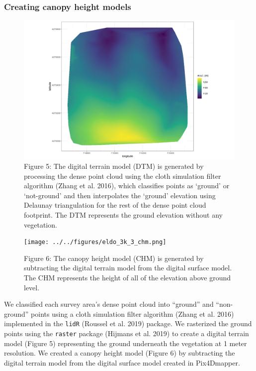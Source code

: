 \documentclass[]{article}
\begin{document}
\subsubsection{Creating canopy height
models}\label{creating-canopy-height-models}

\begin{figure}
\centering
\includegraphics{../../figures/eldo_3k_3_dtm.png}
\caption{Figure 5: The digital terrain model (DTM) is generated by
processing the dense point cloud using the cloth simulation filter
algorithm (Zhang et al. 2016), which classifies points as `ground' or
`not-ground' and then interpolates the `ground' elevation using Delaunay
triangulation for the rest of the dense point cloud footprint. The DTM
represents the ground elevation without any vegetation.}
\end{figure}

\begin{figure}
\centering
\texttt{[image: ../../figures/eldo\_3k\_3\_chm.png]}
\caption{Figure 6: The canopy height model (CHM) is generated by
subtracting the digital terrain model from the digital surface model.
The CHM represents the height of all of the elevation above ground
level.}
\end{figure}

We classified each survey area's dense point cloud into ``ground'' and
``non-ground'' points using a cloth simulation filter algorithm (Zhang
et al. 2016) implemented in the \texttt{lidR} (Roussel et al. 2019)
package. We rasterized the ground points using the \texttt{raster}
package (Hijmans et al. 2019) to create a digital terrain model (Figure
5) representing the ground underneath the vegetation at 1 meter
resolution. We created a canopy height model (Figure 6) by subtracting
the digital terrain model from the digital surface model created in
Pix4Dmapper.
\end{document}
